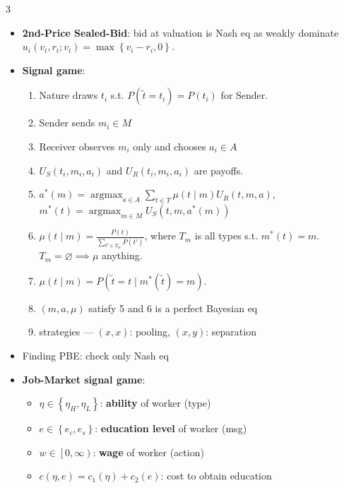\documentclass[8pt]{article}
\DeclareMathOperator*{\argmax}{argmax}
\begin{document}
\begin{multicols*}{3}
\begin{itemize}
            \item \textbf{2nd-Price Sealed-Bid}: bid at valuation is Nash eq as weakly dominate $u_i\left(v_i, r_i; v_i\right) = \max\left\{v_i - r_i, 0\right\}$.
            \item \textbf{Signal game}: 
            \begin{enumerate}
                \setlength\itemsep{0pt}
                \item Nature draws $t_i$ s.t. $P\left(\tilde{t} = t_i\right) = P\left(t_i\right)$ for Sender.
                \item Sender sends $m_i \in M$
                \item Receiver observes $m_i$ only and chooses $a_i \in A$
                \item $U_S\left(t_i, m_i, a_i\right)$ and $U_R\left(t_i, m_i, a_i\right)$ are payoffs.
                \item $a^*\left(m\right) = \argmax_{a \in A}\sum_{t \in T}\mu\left(t \mid m\right)U_R\left(t, m, a\right)$, $m^*\left(t\right) = \argmax_{m \in M}U_S\left(t, m, a^*\left(m\right)\right)$ 
                \item $\mu\left(t \mid m\right) = \frac{P\left(t\right)}{\sum_{t' \in T_m}P\left(t'\right)}$, where $T_m$ is all types s.t. $m^*\left(t\right) = m$. $T_m = \varnothing \implies \mu$ anything.
                \item $\mu\left(t \mid m\right) = P\left(\tilde{t} = t \mid m^*\left(\tilde{t}\right) = m\right)$.
                \item $\left(m, a, \mu\right)$ satisfy 5 and 6 is a perfect Bayesian eq
                \item strategies --- $\left(x, x\right)$: pooling, $\left(x, y\right)$: separation
            \end{enumerate}
            \item Finding PBE: check only Nash eq
            \item \textbf{Job-Market signal game}:
            \begin{itemize}
                \setlength\itemsep{0pt}
                \item $\eta \in \left\{\eta_H, \eta_L\right\}$: \textbf{ability} of worker (type)
                \item $e \in \left\{e_c, e_s\right\}$: \textbf{education level} of worker (msg)
                \item $w \in \left[0, \infty\right)$: \textbf{wage} of worker (action)
                \item $c\left(\eta, e\right) = c_1\left(\eta\right) + c_2\left(e\right)$: cost to obtain education

\end{itemize}
\end{itemize}
\end{multicols*}
\end{document}
